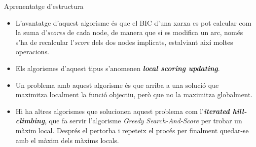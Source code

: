 \documentclass{beamer}
\theoremstyle{definition}
\begin{document}
\begin{frame}{Aprenentatge d'estructura}
\begin{itemize}
\item L'avantatge d'aquest algorisme \'{e}s que el BIC d'una xarxa es pot calcular com la suma d'\emph{scores} de cada node, de manera que si es modifica un arc, nom\'{e}s s'ha de recalcular l'\emph{score} dels dos nodes implicats, estalviant aix\'{i} moltes operacions.
\pause
\item Els algorismes d'aquest tipus s'anomenen \textbf{\emph{local scoring updating}}.
\pause
\item Un problema amb aquest algorisme \'{e}s que arriba a una soluci\'{o} que maximitza localment la funci\'{o} objectiu, per\`{o} que no la maximitza globalment.
\pause
\item Hi ha altres algorismes que solucionen aquest problema com l'\textbf{\emph{iterated hill-climbing}}, que fa servir l'algorisme \emph{Greedy Search-And-Score} per trobar un m\`{a}xim local. Despr\'{e}s el pertorba i repeteix el proc\'{e}s per finalment quedar-se amb el m\`{a}xim dels m\`{a}xims locals.
\end{itemize}
\end{frame}
\end{document}
